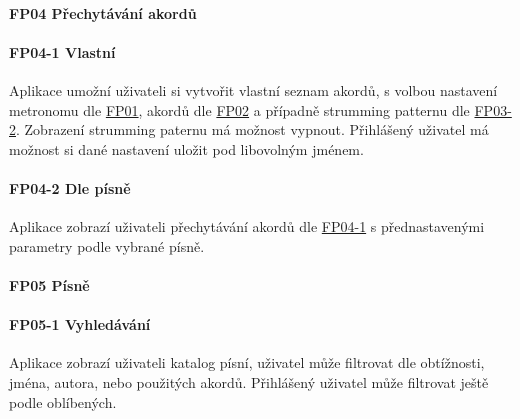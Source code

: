 \noindent \begin{minipage}{\textwidth}
    \paragraph{FP04 Přechytávání akordů}
    \noindent \paragraph{FP04-1 Vlastní} \label{FP04-1}
    \begin{smallindent}{}
        Aplikace umožní uživateli si vytvořit vlastní seznam akordů, s volbou nastavení metronomu dle \hyperref[FP01]{FP01}, akordů dle \hyperref[FP02]{FP02} a případně strumming patternu dle \hyperref[FP03-2]{FP03-2}. Zobrazení strumming paternu má možnost vypnout. 
        Přihlášený uživatel má možnost si dané nastavení uložit pod libovolným jménem.
    \end{smallindent}
\end{minipage}

\noindent \begin{minipage}{\textwidth}
    \paragraph{FP04-2 Dle písně} \label{FP04-2} 
    \begin{smallindent}{}
        Aplikace zobrazí uživateli přechytávání akordů dle \hyperref[FP04-1]{FP04-1} s přednastavenými parametry podle vybrané písně.
    \end{smallindent}
\end{minipage}

\noindent \begin{minipage}{\textwidth}
    \paragraph{FP05 Písně}
    \noindent \paragraph{FP05-1 Vyhledávání} \label{FP05-1}
    \begin{smallindent}{}
        Aplikace zobrazí uživateli katalog písní, uživatel může filtrovat dle obtížnosti, jména, autora, nebo použitých akordů.
        Přihlášený uživatel může filtrovat ještě podle oblíbených.
    \end{smallindent}
\end{minipage}

